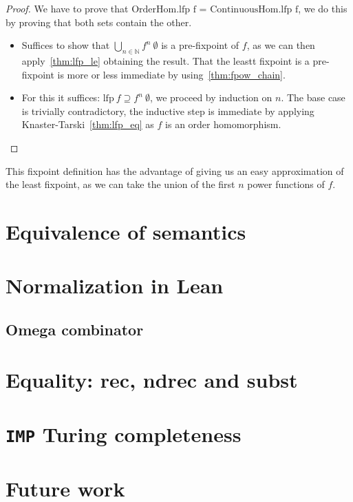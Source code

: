 \documentclass[
  a4paper, 
  10pt, 
  parskip=half, 
  DIV=20,
  toc=bibliography,
  usegeometry,
]{scrartcl}
\newcommand{\funfont}[1]{\text{#1}}
\begin{document}
\begin{proof}
  We have to prove that \(\funfont{OrderHom.lfp f = ContinuousHom.lfp f}\),
  we do this by proving that both sets contain the other.
  \begin{itemize}
    \item[(\(\subseteq\))] Suffices to show that \(\bigcup_{n \in \mathbb{N}} f^n \ \emptyset\)
      is a pre-fixpoint of \(f\), as we can then apply~\ref{thm:lfp_le} obtaining
      the result. That the leastt fixpoint is a pre-fixpoint is more or less
      immediate by using~\ref{thm:fpow_chain}.

    \item[(\(\supseteq\))] For this it suffices: \(\funfont{lfp} \ f \supseteq f^n \ \emptyset\),
      we proceed by induction on \(n\). The base case is trivially contradictory,
      the inductive step is immediate by applying Knaster-Tarski~\ref{thm:lfp_eq}
      as \(f\) is an order homomorphism.
  \end{itemize}
\end{proof}

This fixpoint definition has the advantage of giving us an easy approximation
of the least fixpoint, as we can take the union of the first \(n\) power functions
of \(f\).

\section{Equivalence of semantics}


\appendix

\section{Normalization in Lean}
\subsection{Omega combinator}

\section{Equality: rec, ndrec and subst}

\section{\texttt{IMP} Turing completeness}

\section{Future work}
\end{document}
